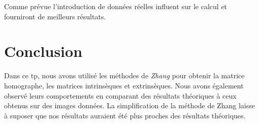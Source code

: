 \documentclass[a4paper,12pt]{report}
\begin{document}
Comme prévue l'introduction de données réelles influent sur le calcul et fourniront de meilleurs résultats.

\newpage

\section*{Conclusion}

Dans ce tp, nous avons utilisé les méthodes de \textit{Zhang} pour obtenir la matrice homographe, les matrices intrinsèques et extrinsèques. Nous avons également observé leurs comportements en comparant des résultats théoriques à ceux obtenus sur des images données. La simplification de la méthode de Zhang laisse à suposer que nos résultats auraient été plus proches des résultats théoriques.
\end{document}
